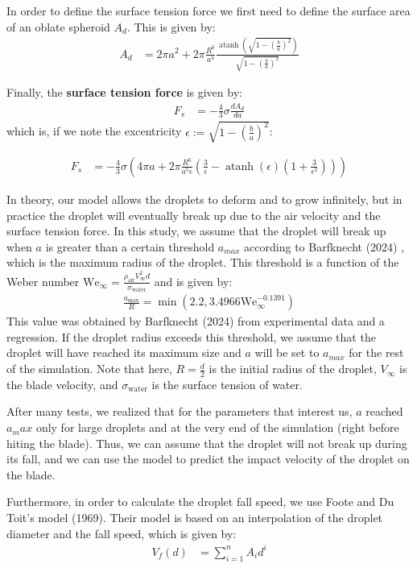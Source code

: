 \documentclass[10pt]{report}
\DeclareMathOperator\atanh{atanh}
\begin{document}
\par In order to define the surface tension force we first need to define the surface area of an oblate spheroid $A_d$. This is given by:
\begin{align}
    A_d &= 2 \pi a^2 + 2 \pi \frac{R^6}{a^4}\frac{\atanh{\left(\sqrt{1-\left(\frac{b}{a}\right)^2}\right)}}{\sqrt{1-\left(\frac{b}{a}\right)^2}}
\end{align}

Finally, the \textbf{surface tension force} is given by:
\begin{align}
    F_s &= -\frac{4}{3}\sigma\frac{dA_d}{da}
\end{align}
which is, if we note the excentricity $\epsilon := \sqrt{1-\left(\frac{b}{a}\right)^2}$:

\begin{align}
    F_s &= -\frac{4}{3}\sigma\left(4\pi a + 2 \pi \frac{R^6}{a^5 \epsilon}\left(\frac{3}{\epsilon} - \atanh(\epsilon)\left( 1  + \frac{3}{\epsilon^2}\right)\right)\right)
\end{align}
\vspace{5mm}

\par In theory, our model allows the droplets to deform and to grow infinitely, but in practice the droplet will eventually break up due to the air velocity and the surface tension force. In this study, we assume that the droplet will break up when $a$ is greater than a certain threshold $a_{max}$ according to Barfknecht (2024) \cite{Barfknecht2024}, which is the maximum radius of the droplet. This threshold is a function of the Weber number  $\text{We}_{\infty} = \frac{\rho_{\text{air}}V_{\infty}^2 d}{\sigma_{\text{water}}} $ and is given by:
\begin{align}
    \frac{a_{\text{max}}}{R} = \min(2.2,3.4966 \text{We}_{\infty}^{-0.1391})
\end{align}
This value was obtained by Barfknecht (2024) \cite{Barfknecht2024} from experimental data and a regression. If the droplet radius exceeds this threshold, we assume that the droplet will have reached its maximum size and $a$ will be set to $a_{max}$ for the rest of the simulation. Note that here, $R = \frac{d}{2}$ is the initial radius of the droplet, $V_{\infty}$ is the blade velocity, and $\sigma_{\text{water}}$ is the surface tension of water.
\par After many tests, we realized that for the parameters that interest us, $a$ reached $a_max$ only for large droplets and at the very end of the simulation (right before hiting the blade). Thus, we can assume that the droplet will not break up during its fall, and we can use the model to predict the impact velocity of the droplet on the blade.
\vspace{5mm}
\par Furthermore, in order to calculate the droplet fall speed, we use Foote and Du Toit's \cite{foote1969terminal} model (1969). Their model is based on an interpolation of the droplet diameter and the fall speed, which is given by:
\begin{align}
    V_f(d) &= \sum_{i=1}^{n} A_i d^i
\end{align}
\end{document}
